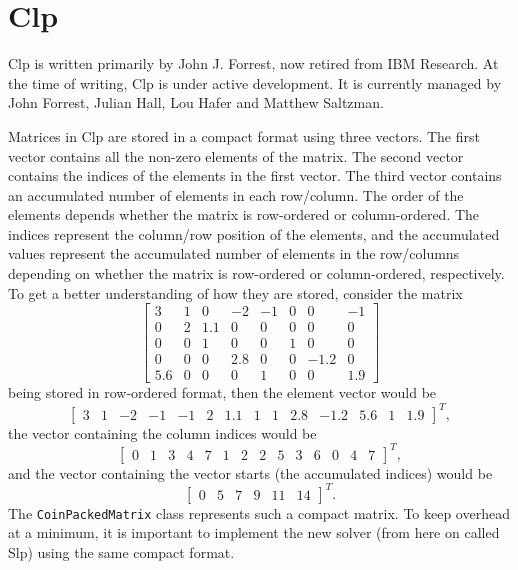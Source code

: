 \section{Clp}
Clp is written primarily by John J. Forrest, now retired from IBM Research. At
the time of writing, Clp is under active development. It is currently
managed by John Forrest, Julian Hall, Lou Hafer and Matthew Saltzman.
\cite{clppage}

Matrices in Clp are stored in a compact format using three vectors.
The first vector contains all the non-zero elements of the matrix.
The second vector contains the indices of the elements in the first vector.
The third vector contains an accumulated number of elements in each row/column.
The order of the elements depends whether the matrix is row-ordered or
column-ordered.
The indices represent the column/row position of the elements, and the
accumulated values represent the accumulated number of elements in the
row/columns depending on whether the matrix is row-ordered or column-ordered,
respectively.
To get a better understanding of how they are stored, consider the matrix
\[
\left[
\begin{array}{rrrrrrrr}
    3 & 1 & 0   & -2  & -1 & 0 & 0    & -1 \\
    0 & 2 & 1.1 & 0   & 0  & 0 & 0    & 0  \\
    0 & 0 & 1   & 0   & 0  & 1 & 0    & 0  \\
    0 & 0 & 0   & 2.8 & 0  & 0 & -1.2 & 0  \\
  5.6 & 0 & 0   & 0   & 1  & 0 & 0    & 1.9  

\end{array}
\right]
\]
being stored in row-ordered format, then the element vector would be
\[
\left[
\begin{array}{rrrrrrrrrrrrrr}
    3 & 1 & -2 & -1 & -1 & 2 & 1.1 & 1 & 1 & 2.8 & -1.2 & 5.6 & 1 & 1.9
\end{array}
\right]^T,
\]
the vector containing the column indices would be
\[
\left[
\begin{array}{rrrrrrrrrrrrrr}
    0 & 1 & 3 & 4 & 7 & 1 & 2 & 2 & 5 & 3 & 6 & 0 & 4 & 7
\end{array}
\right]^T,
\]
and the vector containing the vector starts (the accumulated indices) would be
\[
\left[
\begin{array}{rrrrrr}
    0 & 5 & 7 & 9 & 11 & 14
\end{array}
\right]^T.
\]
The \texttt{CoinPackedMatrix} class represents such a compact matrix.
To keep overhead at a minimum, it is important to implement the new solver
(from here on called Slp) using the same compact format.

